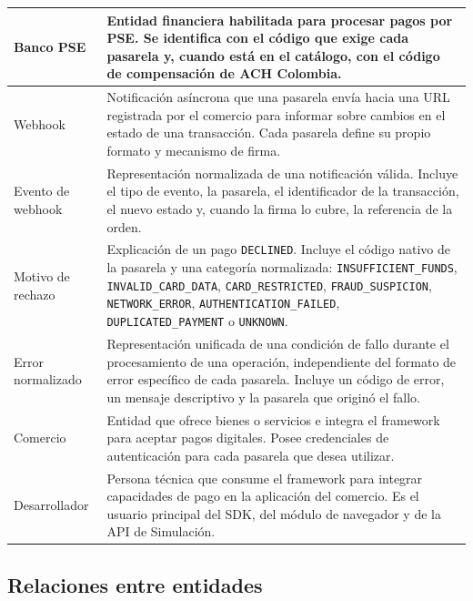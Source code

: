 \begin{longtable}{|l|p{}|}
  \hline
  Banco PSE & Entidad financiera habilitada para procesar pagos por PSE. Se identifica con el código que exige cada pasarela y, cuando está en el catálogo, con el código de compensación de ACH Colombia. \\
  \hline
  Webhook & Notificación asíncrona que una pasarela envía hacia una URL registrada por el comercio para informar sobre cambios en el estado de una transacción. Cada pasarela define su propio formato y mecanismo de firma. \\
  \hline
  Evento de webhook & Representación normalizada de una notificación válida. Incluye el tipo de evento, la pasarela, el identificador de la transacción, el nuevo estado y, cuando la firma lo cubre, la referencia de la orden. \\
  \hline
  Motivo de rechazo & Explicación de un pago \texttt{DECLINED}. Incluye el código nativo de la pasarela y una categoría normalizada: \texttt{INSUFFICIENT\_FUNDS}, \texttt{INVALID\_CARD\_DATA}, \texttt{CARD\_RESTRICTED}, \texttt{FRAUD\_SUSPICION}, \texttt{NETWORK\_ERROR}, \texttt{AUTHENTICATION\_FAILED}, \texttt{DUPLICATED\_PAYMENT} o \texttt{UNKNOWN}. \\
  \hline
  Error normalizado & Representación unificada de una condición de fallo durante el procesamiento de una operación, independiente del formato de error específico de cada pasarela. Incluye un código de error, un mensaje descriptivo y la pasarela que originó el fallo. \\
  \hline
  Comercio & Entidad que ofrece bienes o servicios e integra el framework para aceptar pagos digitales. Posee credenciales de autenticación para cada pasarela que desea utilizar. \\
  \hline
  Desarrollador & Persona técnica que consume el framework para integrar capacidades de pago en la aplicación del comercio. Es el usuario principal del SDK, del módulo de navegador y de la API de Simulación. \\
  \hline
\end{longtable}

\subsection{Relaciones entre entidades}

